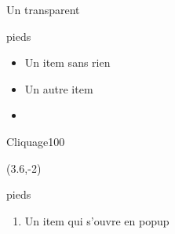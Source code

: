     \begin{frame}{Un transparent}
      \begin{beamercolorbox}[sep=-2pt,left,rounded=true,shadow=true]{pieds}
        \begin{itemize}
           \item Un item sans rien
           \item Un autre item
           \item {}
        \end{itemize}
      \end{beamercolorbox}

    \begin{ocg}{Cliquage}{10}{0}
      \begin{textblock}{11}(3.6,-2)
        \begin{beamercolorbox}[sep=-2pt,left,rounded=true,shadow=true]{pieds}
        \tiny{\hspace{8.5cm}\FermeTout{\color{blue}{$\boxtimes$}}}
            \begin{enumerate}
    \item Un item qui s'ouvre en popup
            \end{enumerate}
        \end{beamercolorbox}
      \end{textblock}
    \end{ocg}

    \end{frame}
